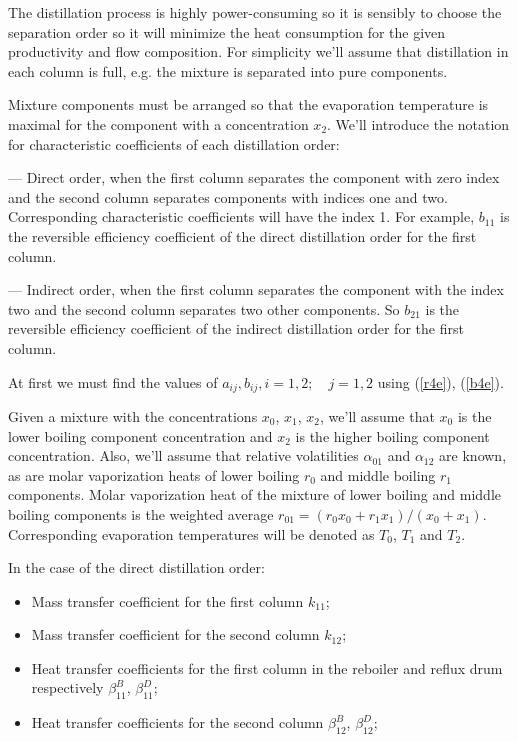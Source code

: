 \documentclass[12pt]{article}
\begin{document}
The distillation process is highly power-consuming so it is sensibly to choose the separation order so it will minimize the heat consumption for the given productivity and flow composition. For simplicity we'll assume that distillation in each column is full, e.g. the mixture is separated into pure components.

Mixture components must be arranged so that the evaporation temperature is maximal for the component with a concentration $x_2$. We'll introduce the notation for characteristic coefficients of each distillation order:

--- Direct order, when the first column separates the component with zero index and the second column separates components with indices one and two. Corresponding characteristic coefficients will have the index 1. For example, $b_{11}$ is the reversible efficiency coefficient of the direct distillation order for the first column.

--- Indirect order, when the first column separates the component with the index two and the second column separates two other components. So $b_{21}$ is the reversible efficiency coefficient of the indirect distillation order for the first column.

At first we must find the values of  $a_{ij}, b_{ij},i=1, 2;\quad j=1, 2$ using (\ref{r4e}), (\ref{b4e}).

Given a mixture with the concentrations $x_0$, $x_1$, $x_2$, we'll assume that $x_0$ is the lower boiling component concentration and $x_2$ is the higher boiling component concentration. Also, we'll assume that relative volatilities $\alpha_{01}$ and $\alpha_{12}$ are known, as are molar vaporization heats of lower boiling $r_0$ and middle boiling $r_1$ components. Molar vaporization heat of the mixture of lower boiling and middle boiling components is the weighted average $r_{01} = (r_0x_0 + r_1x_1)/(x_0+x_1)$. Corresponding evaporation temperatures will be denoted as $T_0$, $T_1$ and $T_2$.

In the case of the direct distillation order:
\begin{itemize}
\item Mass transfer coefficient for the first column $k_{11}$;
\item Mass transfer coefficient for the second column $k_{12}$;
\item Heat transfer coefficients for the first column in the reboiler and reflux drum respectively $\beta^B_{11}$, $\beta^D_{11}$;
\item Heat transfer coefficients for the second column $\beta^B_{12}$, $\beta^D_{12}$;
\end{itemize}
\end{document}
